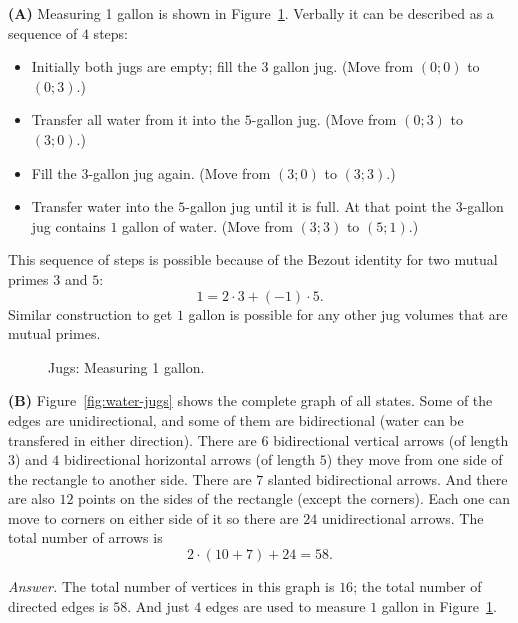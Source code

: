 \documentclass[jou]{apa6}
\begin{document}
{\bf (A)} Measuring 1 gallon is shown in Figure~\ref{fig:water-jugs-path}. 
Verbally it can be described as a sequence of $4$ steps:
\begin{itemize}
\item Initially both jugs are empty; fill the $3$ gallon jug. 
(Move from $(0;0)$ to $(0;3)$.)
\item Transfer all water from it into the $5$-gallon jug. 
(Move from $(0;3)$ to $(3;0)$.)
\item Fill the $3$-gallon jug again. (Move from $(3;0)$ to $(3;3)$.)
\item Transfer water into the $5$-gallon jug until it is full. 
At that point the $3$-gallon jug contains $1$ gallon of water.
(Move from $(3;3)$ to $(5;1)$.)
\end{itemize}

This sequence of steps is possible because of the 
Bezout identity for two mutual primes
$3$ and $5$: 
$$1 = 2\cdot 3 + (-1) \cdot 5.$$
Similar construction to get $1$ gallon is possible for any 
other jug volumes that are mutual primes.



\begin{figure}[!htb]
\caption{\label{fig:water-jugs-path} Jugs: Measuring 1 gallon.}
\end{figure}


{\bf (B)} Figure~\ref{fig:water-jugs} shows the complete graph of all 
states. Some of the edges are unidirectional, and some of them are
bidirectional (water can be transfered in either direction).
There are $6$ bidirectional vertical arrows (of length $3$) 
and $4$ bidirectional 
horizontal arrows (of length $5$) \textendash{} they move from one side of the
rectangle to another side. There are $7$ slanted bidirectional arrows. 
And there are also $12$ points on the sides of the rectangle (except the
corners). Each one can move to corners on either side of it \textendash{}
so there are $24$ unidirectional arrows. The total number of arrows is
$$2 \cdot (10 + 7) + 24 = 58.$$

{\em Answer.} The total number of vertices in this graph is $16$; the total number of
directed edges is $58$. And just $4$ edges are used to measure $1$ gallon
in Figure~\ref{fig:water-jugs-path}.
\end{document}
